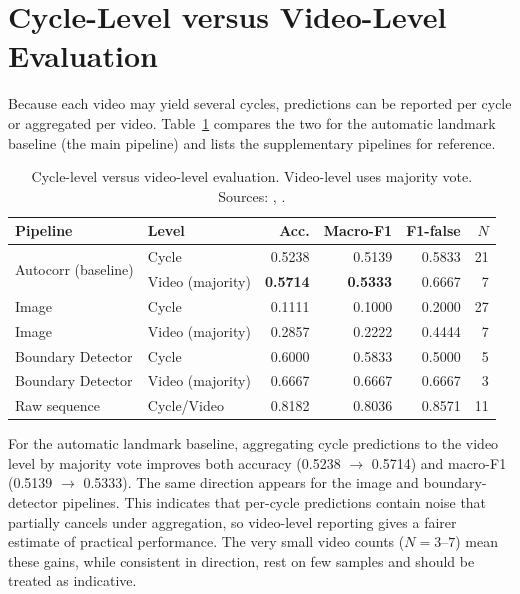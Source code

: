 \section{Cycle-Level versus Video-Level Evaluation}
\label{sec:cycle-vs-video}

Because each video may yield several cycles, predictions can be reported per
cycle or aggregated per video. Table~\ref{tab:cyc-vid} compares the two for the
automatic landmark baseline (the main pipeline) and lists the supplementary
pipelines for reference.

\begin{table}[htbp]
\centering
\caption[Cycle-level versus video-level evaluation.]{Cycle-level versus video-level evaluation. Video-level uses majority vote. Sources: \protect{}, \protect{}.}
\label{tab:cyc-vid}
\small
\begin{tabular}{llrrrr}
\toprule
Pipeline & Level & Acc. & Macro-F1 & F1-false & $N$ \\
\midrule
\multirow{2}{*}{Autocorr (baseline)}
& Cycle & 0.5238 & 0.5139 & 0.5833 & 21 \\
& Video (majority) & \textbf{0.5714} & \textbf{0.5333} & 0.6667 & 7 \\
\midrule
Image & Cycle & 0.1111 & 0.1000 & 0.2000 & 27 \\
Image & Video (majority) & 0.2857 & 0.2222 & 0.4444 & 7 \\
\midrule
Boundary Detector & Cycle & 0.6000 & 0.5833 & 0.5000 & 5 \\
Boundary Detector & Video (majority) & 0.6667 & 0.6667 & 0.6667 & 3 \\
\midrule
Raw sequence & Cycle/Video & 0.8182 & 0.8036 & 0.8571 & 11 \\
\bottomrule
\end{tabular}
\end{table}

For the automatic landmark baseline, aggregating cycle predictions to the video
level by majority vote improves both accuracy (0.5238 $\rightarrow$ 0.5714) and
macro-F1 (0.5139 $\rightarrow$ 0.5333). The same direction appears for the image
and boundary-detector pipelines. This indicates that per-cycle predictions
contain noise that partially cancels under aggregation, so video-level reporting
gives a fairer estimate of practical performance. The very
small video counts ($N=3$--$7$) mean these gains, while consistent in
direction, rest on few samples and should be treated as indicative.

